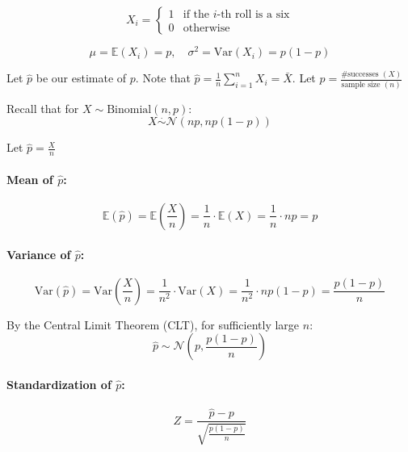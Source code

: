 \[
X_i =
\begin{cases}
1 & \text{if the $i$-th roll is a six} \\
0 & \text{otherwise}
\end{cases}
\]

\[
\mu = \mathbb{E}(X_i) = p, \quad \sigma^2 = \mathrm{Var}(X_i) = p(1 - p)
\]

Let $\hat{p}$ be our estimate of $p$. Note that $\hat{p} = \frac{1}{n} \sum_{i=1}^{n} X_i = \bar{X}$.
Let $\hat{p} = \frac{\text{\# successes } (X)}{\text{sample size } (n)}$

Recall that for $X \sim \text{Binomial}(n, p)$:
\[
X \overset{\cdot}{\sim} \mathcal{N}(np, np(1 - p))
\]

Let $\hat{p} = \frac{X}{n}$

\paragraph*{Mean of $\hat{p}$:}

\[
\mathbb{E}(\hat{p}) = \mathbb{E} \left( \frac{X}{n} \right) = \frac{1}{n} \cdot \mathbb{E}(X) = \frac{1}{n} \cdot np = p
\]

\paragraph*{Variance of $\hat{p}$:}

\[
\mathrm{Var}(\hat{p}) = \mathrm{Var} \left( \frac{X}{n} \right) = \frac{1}{n^2} \cdot \mathrm{Var}(X) = \frac{1}{n^2} \cdot np(1 - p) = \frac{p(1 - p)}{n}
\]

By the Central Limit Theorem (CLT), for sufficiently large $n$:
\[
\hat{p} \sim \mathcal{N} \left( p, \frac{p(1 - p)}{n} \right)
\]

\paragraph*{Standardization of $\hat{p}$:}
\[
Z = \frac{\hat{p} - p}{\sqrt{ \frac{p(1 - p)}{n} }}
\]


